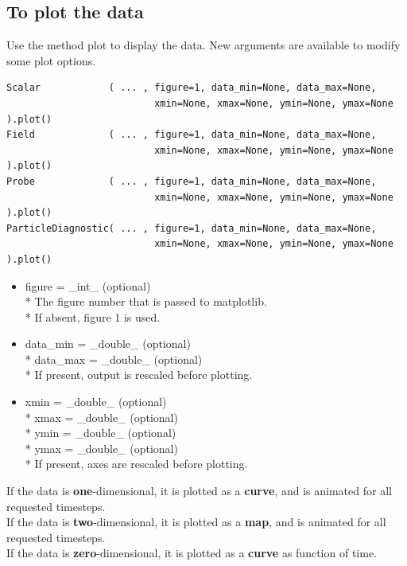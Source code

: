 \documentclass[11pt]{article}
\newcommand{\code}[1]{\colorbox{yellow!15}{\ttfamily #1}}
\begin{document}
\subsection{To plot the data}
Use the method \code{plot} to display the data. New arguments are available to modify some plot options.
\begin{lstlisting}
Scalar            ( ... , figure=1, data_min=None, data_max=None,
                          xmin=None, xmax=None, ymin=None, ymax=None ).plot()
Field             ( ... , figure=1, data_min=None, data_max=None,
                          xmin=None, xmax=None, ymin=None, ymax=None ).plot()
Probe             ( ... , figure=1, data_min=None, data_max=None,
                          xmin=None, xmax=None, ymin=None, ymax=None ).plot()
ParticleDiagnostic( ... , figure=1, data_min=None, data_max=None,
                          xmin=None, xmax=None, ymin=None, ymax=None ).plot()
\end{lstlisting}

\begin{itemize}
\item \code{figure} = \code{\_int\_}       (optional)\\*
	The figure number that is passed to matplotlib.\\*
	If absent, figure 1 is used.

\item \code{data\_min} = \code{\_double\_}    (optional)\\*
	\code{data\_max} = \code{\_double\_}    (optional)\\*
	If present, output is rescaled before plotting.

\item \code{xmin} = \code{\_double\_}    (optional)\\*
	\code{xmax} = \code{\_double\_}    (optional)\\*
	\code{ymin} = \code{\_double\_}    (optional)\\*
	\code{ymax} = \code{\_double\_}    (optional)\\*
	If present, axes are rescaled before plotting.
\end{itemize}

If the data is \textbf{one}-dimensional, it is plotted as a \textbf{curve}, and is animated for all requested timesteps.\\
If the data is \textbf{two}-dimensional, it is plotted as a \textbf{map}, and is animated for all requested timesteps.\\
If the data is \textbf{zero}-dimensional, it is plotted as a \textbf{curve} as function of time.\\
\end{document}
